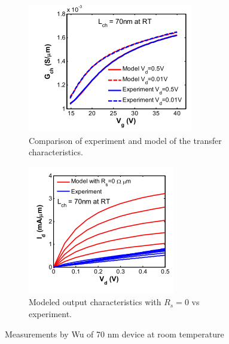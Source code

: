 \documentclass[11pt]{article}
\begin{document}
\begin{figure}[h!]
\centering 
\begin{subfigure}[b]{0.3\textwidth}
        \includegraphics[width=\textwidth]{paper1_idvg3.png}
        \caption{Comparison of experiment and model of the transfer characteristics.}
        \label{fig:Idvg}
\end{subfigure}
\begin{subfigure}[b]{0.3\textwidth}
        \includegraphics[width=\textwidth]{paper1_idvd3.png}
        \caption{Modeled output characteristics with $R_s=0$ vs experiment.}
        \label{fig:Idvd}
\end{subfigure}
\caption{Measurements by Wu of 70 nm device at room temperature}\label{fig:animals}
\end{figure}
\end{document}
